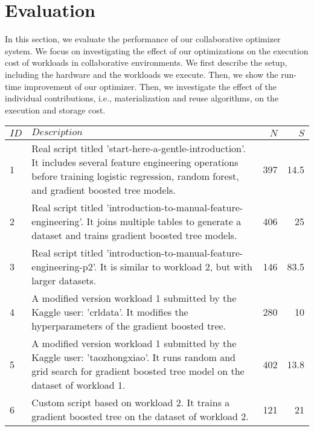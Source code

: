 \section{Evaluation} \label{sec-evaluation} 
In this section, we evaluate the performance of our collaborative optimizer system.
We focus on investigating the effect of our optimizations on the execution cost of workloads in collaborative environments.
We first describe the setup, including the hardware and the workloads we execute.
Then, we show the run-time improvement of our optimizer.
Then, we investigate the effect of the individual contributions, i.e., materialization and reuse algorithms, on the execution and storage cost.
\begin{table*}[t]
\begin{tabular}{lp{}rr}
\hline
\textbf{$ID$} & \textbf{$Description$}& \textbf{$N$}& \textbf{$S$}   \\
\hline
1 &  \parbox[t]{0.84\textwidth}{\linespread{0.5}\selectfont \small Real script titled 'start-here-a-gentle-introduction'. It includes several feature engineering operations before training logistic regression, random forest, and gradient boosted tree models.} & 397 & 14.5\\[0.4cm]

2 &   \parbox[t]{0.84\textwidth}{\linespread{0.5}\selectfont \small Real script titled 'introduction-to-manual-feature-engineering'. It joins multiple tables to generate a dataset and trains gradient boosted tree models.} & 406 & 25\\[0.4cm]

3 &   \parbox[t]{0.84\textwidth}{\linespread{0.5}\selectfont \small Real script titled 'introduction-to-manual-feature-engineering-p2'. It is similar to workload 2, but with larger datasets.} & 146 & 83.5\\[0.15cm]

4 & \parbox[t]{0.84\textwidth}{\linespread{0.5}\selectfont \small A modified version workload 1 submitted by the Kaggle user: 'crldata'. It modifies the hyperparameters of the gradient boosted tree.} & 280 & 10\\[0.4cm]

5 & \parbox[t]{0.84\textwidth}{\linespread{0.5}\selectfont \small A modified version workload 1 submitted by the Kaggle user: 'taozhongxiao'. It runs random and grid search for gradient boosted tree model on the dataset of workload 1.} & 402 & 13.8\\[0.4cm]

6 & \parbox[t]{0.84\textwidth}{\linespread{0.5}\selectfont \small Custom script based on workload 2. It trains a gradient boosted tree on the dataset of workload 2.} & 121 & 21\\[0.15cm]


\end{tabular}
\end{table*}

